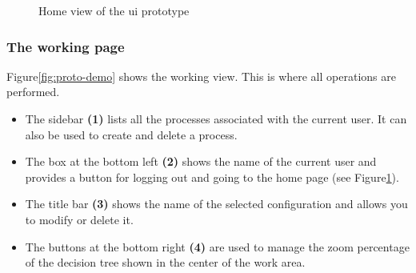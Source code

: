     \begin{figure}[H]
    \centering
    \caption{\label{fig:proto-home}  Home view of the \acrshort{ui} prototype}
    \end{figure}
    
    
    \subsubsection{The working page}
    Figure\ref{fig:proto-demo} shows the working view. This is where all operations are performed. 
    
    \begin{itemize}
        \item The sidebar \textbf{(1)} lists all the processes associated with the current user. It can also be used to create and delete a process.
        \item The box at the bottom left \textbf{(2)} shows the name of the current user and provides a button for logging out and going to the home page (see Figure\ref{fig:proto-home}).
        \item The title bar \textbf{(3)} shows the name of the selected configuration and allows you to modify or delete it.
        \item The buttons at the bottom right \textbf{(4)} are used to manage the zoom percentage of the decision tree shown in the center of the work area.
    \end{itemize}
    

